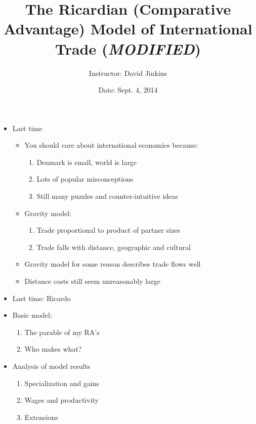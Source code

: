\documentclass[ignorenonframetext,]{beamer}
\title{The Ricardian (Comparative Advantage) Model of International Trade (\emph{MODIFIED})}
\author{Instructor: David Jinkins}
\date{Date: Sept. 4, 2014}
\begin{document}
\frame{\titlepage}

\begin{frame}
\begin{itemize}
\itemsep1pt\parskip0pt
\item
  Last time 

  \begin{itemize}
  \itemsep1pt\parskip0pt
  \item You should care about international economics because:
      \begin{enumerate}
          \item Denmark is small, world is large
          \item Lots of popular misconceptions
          \item Still many puzzles and counter-intuitive ideas
      \end{enumerate}
  \item Gravity model:
      \begin{enumerate}
          \item Trade proportional to product of partner sizes 
          \item Trade falls with distance, geographic and cultural 
      \end{enumerate}
  \item Gravity model for some reason describes trade flows well
  \item Distance costs still seem unreasonably large 
  \end{itemize}
\end{itemize}

\end{frame}

\begin{frame}

\begin{itemize}
  \item Last time: Ricardo
  \item Basic model:
  \begin{enumerate}
    \item The parable of my RA's
    \item Who makes what?
  \end{enumerate}
  \item Analysis of model results 
  \begin{enumerate}
    \item Specialization and gains 
    \item Wages and productivity 
    \item Extensions
  \end{enumerate}
\end{itemize}

\end{frame}
\end{document}
